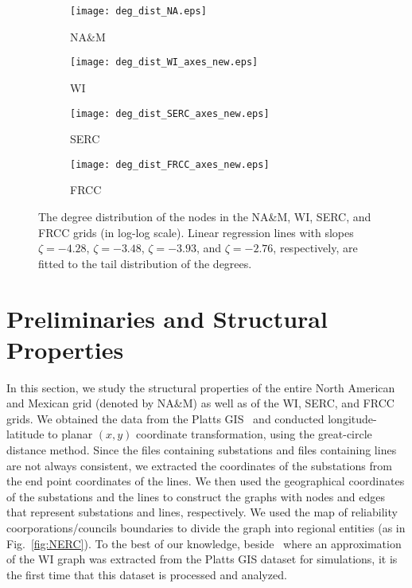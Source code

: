 \documentclass[10pt,journal]{IEEEtran}
\begin{document}
\begin{figure*}[t]
\centering
\begin{subfigure}[b]{0.24\textwidth}
\vspace*{-0.2cm}
\texttt{[image: deg\_dist\_NA.eps]}
\vspace*{-0.2cm}
\caption{NA\&M}
\end{subfigure}
\begin{subfigure}[b]{0.24\textwidth}
\vspace*{-0.2cm}
\texttt{[image: deg\_dist\_WI\_axes\_new.eps]}
\vspace*{-0.2cm}
\caption{WI}
\end{subfigure}
\begin{subfigure}[b]{0.24\textwidth}
\vspace*{-0.2cm}
\texttt{[image: deg\_dist\_SERC\_axes\_new.eps]}
\vspace*{-0.2cm}
\caption{SERC}
\end{subfigure}
\begin{subfigure}[b]{0.24\textwidth}
\vspace*{-0.2cm}
\texttt{[image: deg\_dist\_FRCC\_axes\_new.eps]}
\vspace*{-0.2cm}
\caption{FRCC}
\end{subfigure}
\caption{The degree distribution of the nodes in the NA\&M, WI, SERC, and FRCC grids (in
log-log scale). Linear regression lines with slopes $\zeta=-4.28$, $\zeta=-3.48$, $\zeta=-3.93$, and $\zeta=-2.76$, respectively, are fitted to
the tail distribution of the degrees.}
\label{fig:deg_dist_WI}
\vspace*{0.2cm}
\end{figure*}

\section{Preliminaries and Structural Properties}\label{sec:struc_prop}
In this section, we study the structural properties of the entire North American and Mexican grid (denoted by \mbox{NA\&M}) as well as of the WI, SERC, and FRCC grids.
We obtained the data from the Platts GIS~\cite{GIS} and conducted longitude-latitude to planar $(x,y)$ coordinate transformation, using the great-circle distance method. Since the files containing substations and files containing lines are not always consistent,
we extracted the coordinates of the substations from the end point coordinates of the lines.  We then used the geographical coordinates of the substations and the lines to construct the graphs with nodes and edges that represent substations and lines, respectively.  We used the map of reliability coorporations/councils boundaries to divide the graph into regional entities (as in Fig.~\ref{fig:NERC}).
To the best of our knowledge, beside~\cite{SmartGridComm11rep,Soltan2014Cascade} where an approximation of the WI graph was extracted from the Platts GIS dataset for simulations, it is the first time that this dataset is processed and analyzed.
\end{document}
